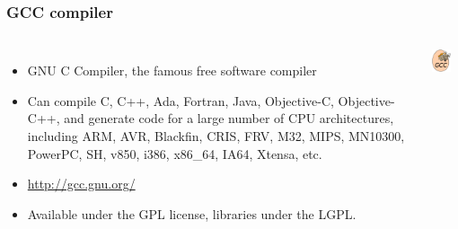 \begin{frame}
  \frametitle{GCC compiler}
  \begin{columns}
    \begin{itemize}
    \item GNU C Compiler, the famous free software compiler
    \item Can compile C, C++, Ada, Fortran, Java, Objective-C,
      Objective-C++, and generate code for a large number of CPU
      architectures, including ARM, AVR, Blackfin, CRIS, FRV, M32, MIPS,
      MN10300, PowerPC, SH, v850, i386, x86\_64, IA64, Xtensa, etc.
    \item \url{http://gcc.gnu.org/}
    \item Available under the GPL license, libraries under the LGPL.
    \end{itemize}
    \includegraphics[width=0.7\textwidth]{slides/sysdev-toolchains-definition/gcc.png}
  \end{columns}
\end{frame}

